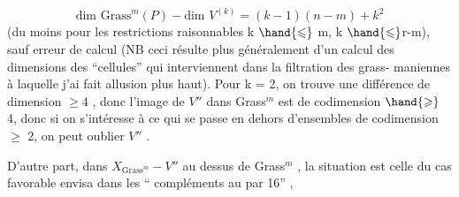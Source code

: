 \[ \text{dim Grass}^m(P) - \text{dim } V^{(k)} = (k-1)(n-m) + k^2 \]
(du moins pour les restrictions raisonnables k $\hand{\leqslant}$ m, k $\hand{\leqslant}$r-m), sauf
erreur de calcul (NB ceci résulte plus généralement d'un calcul des
dimensions des ``cellules'' qui interviennent dans la filtration des grass-%
maniennes à laquelle j'ai fait allusion plus haut). Pour k = 2, on
trouve une différence de dimension $\geqslant 4$ , donc l'image de $V''$ dans Grass$^m$
est de codimension $\hand{\geqslant}$ 4, donc si on s'intéresse à ce qui se passe en dehors
d'ensembles  de codimension $\geqslant$ 2, on peut  oublier $V''$ .

D'autre part, dans $X_{\text{Grass}^m} - V''$ au dessus de Grass$^m$ , la situation
est celle du cas favorable envisa dans les `` compléments au par 16'' ,

